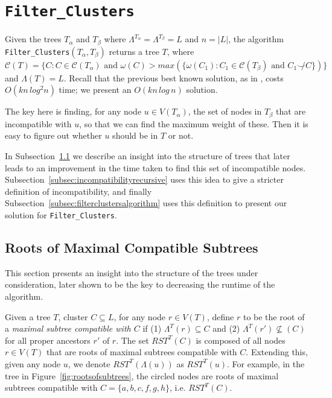\documentclass{article}
\newcommand{\compatible}{\smile}
\newcommand{\leafset}{\Lambda}
\newcommand{\weight}{\omega}
\newcommand{\TA}{T_\alpha}
\newcommand{\TB}{T_\beta}
\begin{document}
    \section{\texttt{Filter\_Clusters}}
    \label{sec:filterclusters}

    Given the trees $\TA$ and $\TB$ where $\leafset^{\TA} = \leafset^{\TB} = L$ and $n = |L|$, the algorithm \texttt{Filter\_Clusters}$(\TA, \TB)$ returns a tree $T$, where $\mathcal{C}(T) = \{C : C \in \mathcal{C}(\TA) \text{ and } \weight(C) > max(\{\weight(C_1) : C_1 \in \mathcal{C}(\TB) \text{ and } C_1 \not\compatible C\})\}$ and $\leafset(T) = L$. Recall that the previous best known solution, as in \cite{jansson2018algorithms}, costs $O(kn\,log^2n)$ time; we present an $O(kn\,log\,n)$ solution.

    The key here is finding, for any node $u \in V(\TA)$, the set of nodes in $\TB$ that are incompatible with $u$, so that we can find the maximum weight of these. Then it is easy to figure out whether $u$ should be in $T$ or not.

    In Subsection~\ref{subsec:rootsofsubtrees} we describe an insight into the structure of trees that later leads to an improvement in the time taken to find this set of incompatible nodes. Subsection~\ref{subsec:incompatibilityrecursive} uses this idea to give a stricter definition of incompatibility, and finally Subsection~\ref{subsec:filterclustersalgorithm} uses this definition to present our solution for \texttt{Filter\_Clusters}.

    \subsection{Roots of Maximal Compatible Subtrees}
    \label{subsec:rootsofsubtrees}

    This section presents an insight into the structure of the trees under consideration, later shown to be the key to decreasing the runtime of the algorithm.

    Given a tree $T$, cluster $C \subseteq L$, for any node $r \in V(T)$, define $r$ to be the root of a \textit{maximal subtree compatible with $C$} if (1) $\leafset^T(r) \subseteq C$ and (2) $\leafset^T(r') \not\subseteq(C)$ for all proper ancestors $r'$ of $r$. The set $RST^{T}(C)$ is composed of all nodes $r \in V(T)$ that are roots of maximal subtrees compatible with $C$. Extending this, given any node $u$, we denote $RST^{T}(\leafset(u))$ as $RST^{T}(u)$. For example, in the tree in Figure~\ref{fig:rootsofsubtrees}, the circled nodes are roots of maximal subtrees compatible with $C = \{a, b, c, f, g, h\}$, i.e. $RST^{T}(C)$.
\end{document}
